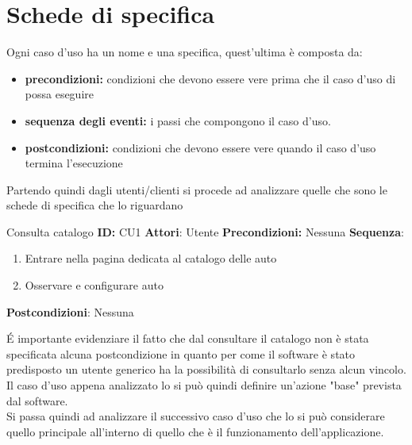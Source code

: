 \documentclass[a4paper, 11pt,oneside]{book}
\newcommand{\spacing}{\par\bigskip\noindent}
\begin{document}
    \section{Schede di specifica}
        Ogni caso d'uso ha un nome e una specifica, quest'ultima è composta da:
        \begin{itemize}
            \item \textbf{precondizioni:} condizioni che devono essere vere prima che il caso d'uso di possa eseguire
            \item \textbf{sequenza degli eventi:} i passi che compongono il caso d'uso.
            \item \textbf{postcondizioni:} condizioni che devono essere vere quando il caso d'uso termina l'esecuzione
        \end{itemize}
        Partendo quindi dagli utenti/clienti si procede ad analizzare quelle che sono le schede di specifica che lo riguardano
        \begin{mybox}{Consulta catalogo}
           \textbf{ID:} CU1
           \tcbline
           \textbf{Attori}: Utente
           \tcbline
           \textbf{Precondizioni:} Nessuna
           \tcbline
           \textbf{Sequenza}: 
           \begin{enumerate}
            \item Entrare nella pagina dedicata al catalogo delle auto
            \item Osservare e configurare auto
           \end{enumerate}
           \tcbline
           \textbf{Postcondizioni}: Nessuna
        \end{mybox}
        \spacing
        \'E importante evidenziare il fatto che dal consultare il catalogo non è stata specificata alcuna postcondizione in quanto per come il software è stato
        predisposto un utente generico ha la possibilità di consultarlo senza alcun vincolo. Il caso d'uso appena analizzato lo si può quindi definire un'azione "base"
        prevista dal software.\\
        Si passa quindi ad analizzare il successivo caso d'uso che lo si può considerare quello principale all'interno di quello che è il funzionamento dell'applicazione.
\end{document}
